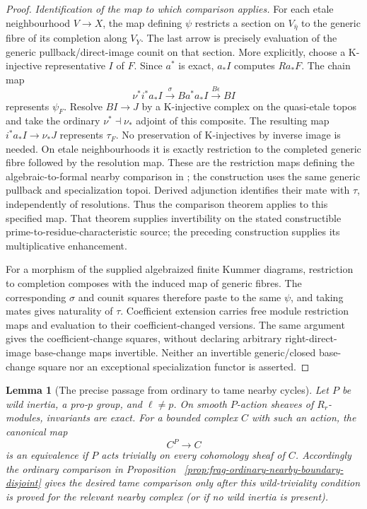 \documentclass[11pt]{article}
\newtheorem{lemma}[theorem]{Lemma}
\theoremstyle{definition}
\theoremstyle{remark}
\begin{document}
\begin{proof}
\emph{Identification of the map to which comparison applies.}
For each etale neighbourhood $V\to X$, the map defining $\psi$
restricts a section on $V_{\bar\eta}$ to the generic fibre of its
completion along $V_Y$.  The last arrow is precisely evaluation
of the generic pullback/direct-image counit on that section.
More explicitly, choose a K-injective representative $I$ of $F$.
Since $a^*$ is exact, $a_*I$ computes $Ra_*F$.  The chain map
\[
 \nu^*i^*a_*I\xrightarrow{\sigma}B a^*a_*I
       \xrightarrow{B\epsilon}BI
\]
represents $\psi_F$.  Resolve $BI\to J$ by a K-injective complex
on the quasi-etale topos and take the ordinary $\nu^*\dashv\nu_*$
adjoint of this composite.  The resulting map
$i^*a_*I\to\nu_*J$ represents $\tau_F$.
No preservation of K-injectives by inverse image is needed.
On etale neighbourhoods it is exactly restriction to the completed
generic fibre followed by the resolution map.  These are the
restriction maps defining the algebraic-to-formal nearby comparison
in \cite[\S\S2--3, Theorem 3.1]{BerkovichFormalII}; the construction
uses the same generic pullback and specialization topoi.
Derived adjunction identifies their mate with $\tau$, independently
of resolutions.  Thus the comparison theorem applies to this specified
map.
That theorem supplies invertibility
on the stated constructible prime-to-residue-characteristic source;
the preceding construction supplies its multiplicative enhancement.

For a morphism of the supplied algebraized finite Kummer diagrams,
restriction to completion composes with the induced map of generic
fibres.  The corresponding $\sigma$ and counit squares therefore
paste to the same $\psi$, and taking mates gives naturality of $\tau$.
Coefficient extension carries free module restriction maps and
evaluation to their coefficient-changed versions.  The same argument
gives the coefficient-change squares, without declaring arbitrary
right-direct-image base-change maps invertible.  Neither an
invertible generic/closed base-change square nor an exceptional
specialization functor is asserted.
\end{proof}

\begin{lemma}[The precise passage from ordinary to tame nearby cycles]
\label{lem:frag-wild-inertia-criterion}
Let $P$ be wild inertia, a pro-$p$ group, and $\ell\ne p$.  On smooth
$P$-action sheaves of $R_r$-modules, invariants are exact.  For a
bounded complex $C$ with such an action, the canonical map
\[
 C^P\longrightarrow C
\]
is an equivalence if $P$ acts trivially on every cohomology sheaf of
$C$.  Accordingly the ordinary comparison in Proposition~
\ref{prop:frag-ordinary-nearby-boundary-disjoint} gives the desired
tame comparison only after this wild-triviality condition is proved
for the relevant nearby complex (or if no wild inertia is present).
\end{lemma}
\end{document}
